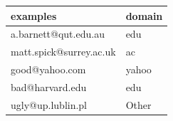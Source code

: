 \begin{table}[ht]
\centering
\begin{tabular}{ll}
 examples & domain \\ 
  \hline
a.barnett@qut.edu.au & edu \\ 
  matt.spick@surrey.ac.uk & ac \\ 
  good@yahoo.com & yahoo \\ 
  bad@harvard.edu & edu \\ 
  ugly@up.lublin.pl & Other \\ 
  \end{tabular}
\end{table}
